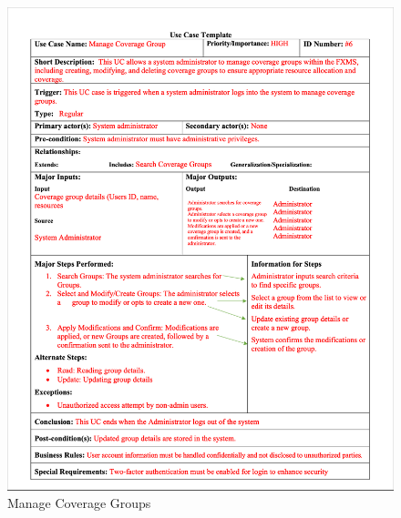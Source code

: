\documentclass[a4paper]{report}
\begin{document}
\begin{figure}[h!]
    \centering
    \includegraphics[width=\textwidth]{images/uc/6-manage-coverage-groups.png}
    \caption{Manage Coverage Groups}
    \label{fig:6-manage-coverage-groups}
\end{figure}
\end{document}
